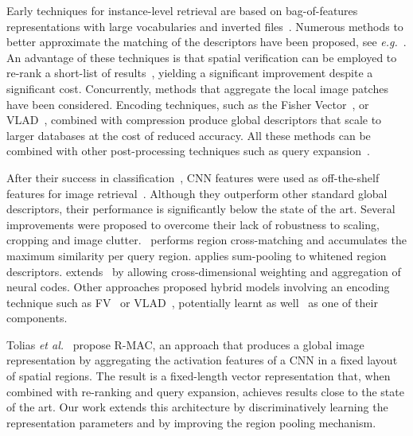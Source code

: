 \documentclass[runningheads]{llncs}
\newcommand{\myparagraph}[1]{\noindent {\bf #1.}}
\def\etal{\emph{et al.}~}
\def\eg{\emph{e.g.}~}
\begin{document}
\myparagraph{Conventional image retrieval} 
Early techniques for instance-level retrieval are based on bag-of-features representations with large vocabularies 
and inverted files~\cite{Nister2006,Philbin2007}. Numerous methods to better approximate the matching of the descriptors 
have been proposed, see \eg\cite{Mikulik2013,Jegou2010}.
An advantage of these techniques is that spatial verification can be employed to re-rank a short-list of results~\cite{Philbin2007,Perdoch2009}, yielding a significant improvement despite a significant cost.
Concurrently, methods that aggregate the local image patches have been considered. Encoding techniques, such as the
Fisher Vector~\cite{Perronnin2007}, or VLAD~\cite{Jegou2010aggregating}, combined with compression
\cite{Perronnin2010,Jegou2012,Radenovic2015} produce global descriptors that scale to larger databases at the cost of reduced accuracy.
All these methods can be combined with other post-processing techniques such as query expansion~\cite{Chum2007,Chum2011,Arandjelovic2012three}.

\myparagraph{CNN-based retrieval} After their success in classification~\cite{Krizhevsky2012}, CNN features were used as
off-the-shelf features for image retrieval~\cite{Razavian2014,Babenko2014}. Although they outperform other standard
global descriptors, their performance is significantly below the state of the art.  Several improvements were proposed
to overcome their lack of robustness to scaling, cropping and image clutter. \cite{Razavian2014}~performs
region cross-matching and accumulates the maximum similarity per query region. \cite{Babenko2015} applies sum-pooling
to whitened region descriptors. \cite{Kalantidis2015} extends~\cite{Babenko2015} by allowing cross-dimensional
weighting and aggregation of neural codes.  Other approaches proposed hybrid models involving an encoding technique such
as FV~\cite{Perronnin2015} or VLAD~\cite{Gong2014,Paulin2015}, potentially learnt as well~\cite{Arandjelovic2016} as one of their components.

Tolias \etal\cite{Tolias2016} propose R-MAC, an approach that produces a global image representation by aggregating the activation features of a CNN in a fixed layout of spatial regions. The result is a fixed-length vector representation that, when combined with re-ranking and query expansion, achieves results close to the state of the art. 
Our work extends this architecture by discriminatively learning the representation parameters and by improving the region pooling mechanism.
\end{document}

